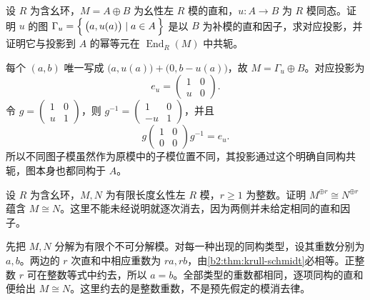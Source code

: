 \begin{exercise}\label{b2:ex:12-graph-projection}
	设 \(R\) 为含幺环，\(M=A\oplus B\) 为幺性左 \(R\) 模的直和，\(u:A\rightarrow B\) 为 \(R\) 模同态。证明 \(u\) 的图 \(\Gamma_u=\Bigl\{\,\bigl(a,u(a)\bigr)\mid a\in A\,\Bigr\}\) 是以 \(B\) 为补模的直和因子，求对应投影，并证明它与投影到 \(A\) 的幂等元在 \(\operatorname{End}_R(M)\) 中共轭。
\end{exercise}
\begin{solution}
	每个 \((a,b)\) 唯一写成 \(\bigl(a,u(a)\bigr)+\bigl(0,b-u(a)\bigr)\)，故 \(M=\Gamma_u\oplus B\)。对应投影为
	\[
		e_u=\begin{pmatrix}1&0\\u&0\end{pmatrix}.
	\]
	令 \(g=\begin{pmatrix}1&0\\u&1\end{pmatrix}\)，则 \(g^{-1}=\begin{pmatrix}1&0\\-u&1\end{pmatrix}\)，并且
	\[
		g\begin{pmatrix}1&0\\0&0\end{pmatrix}g^{-1}=e_u.
	\]
	所以不同图子模虽然作为原模中的子模位置不同，其投影通过这个明确自同构共轭，图本身也都同构于 \(A\)。
\end{solution}

\begin{exercise}\label{b2:ex:12-power-cancellation}
	设 \(R\) 为含幺环，\(M,N\) 为有限长度幺性左 \(R\) 模，\(r\ge1\) 为整数。证明 \(M^{\oplus r}\cong N^{\oplus r}\) 蕴含 \(M\cong N\)。这里不能未经说明就逐次消去，因为两侧并未给定相同的直和因子。
\end{exercise}
\begin{solution}
	先把 \(M,N\) 分解为有限个不可分解模。对每一种出现的同构类型，设其重数分别为 \(a,b\)。两边的 \(r\) 次直和中相应重数为 \(ra,rb\)，由\cref{b2:thm:krull-schmidt}必相等。正整数 \(r\) 可在整数等式中约去，所以 \(a=b\)。全部类型的重数都相同，逐项同构的直和便给出 \(M\cong N\)。这里约去的是整数重数，不是预先假定的模消去律。
\end{solution}


